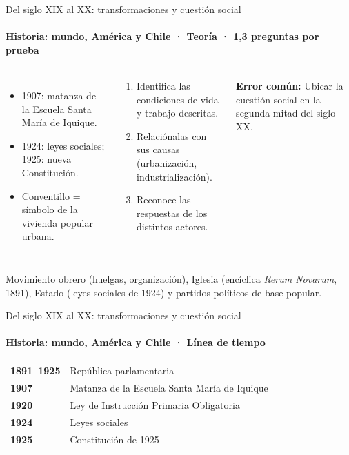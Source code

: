 \documentclass[aspectratio=169,11pt]{beamer}
\makeatletter
\newenvironment{lineatiempo}
  {\footnotesize\renewcommand{\arraystretch}{1.15}\begin{tabular}{@{}>{\leavevmode\bfseries\color{zinc700}}p{0.14\textwidth}p{0.74\textwidth}@{}}}
  {\end{tabular}}
\newlength{\ajustealto}
\newenvironment{ajustar}[1][0.74\textheight]
  {\setlength{\ajustealto}{#1}\begin{lrbox}{\ajustecaja}\begin{minipage}{\textwidth}}
  {\end{minipage}\end{lrbox}%
   \ifdim\dimexpr\ht\ajustecaja+\dp\ajustecaja\relax>\ajustealto
     \resizebox*{!}{\ajustealto}{\usebox{\ajustecaja}}\else\usebox{\ajustecaja}\fi}
\makeatother
\begin{document}
\begin{frame}{Del siglo XIX al XX: transformaciones y cuestión social}
\label{tema-hi-cuestion-social}
\framesubtitle{Historia: mundo, América y Chile · Teoría · 1,3 preguntas por prueba}
\begin{ajustar}
\begin{columns}[T,onlytextwidth]
\begin{itemize}\footnotesize
\item 1907: matanza de la Escuela Santa María de Iquique.
\item 1924: leyes sociales; 1925: nueva Constitución.
\item Conventillo = símbolo de la vivienda popular urbana.
\end{itemize}
\begin{cajaregla}\scriptsize \begin{enumerate}\item Identifica las condiciones de vida y trabajo descritas.\item Relaciónalas con sus causas (urbanización, industrialización).\item Reconoce las respuestas de los distintos actores.\end{enumerate}\end{cajaregla}
\begin{notagris}\scriptsize \textbf{Error común:} Ubicar la cuestión social en la segunda mitad del siglo XX.\end{notagris}
\end{columns}
\begin{cajaclave}\footnotesize
Movimiento obrero (huelgas, organización), Iglesia (encíclica \emph{Rerum Novarum}, 1891), Estado (leyes sociales de 1924) y partidos políticos de base popular.
\end{cajaclave}
\end{ajustar}
\end{frame}

\begin{frame}{Del siglo XIX al XX: transformaciones y cuestión social}
\framesubtitle{Historia: mundo, América y Chile · Línea de tiempo}
\begin{lineatiempo}
1891–1925 & República parlamentaria \\
1907 & Matanza de la Escuela Santa María de Iquique \\
1920 & Ley de Instrucción Primaria Obligatoria \\
1924 & Leyes sociales \\
1925 & Constitución de 1925 \\
\end{lineatiempo}
\end{frame}
\end{document}
